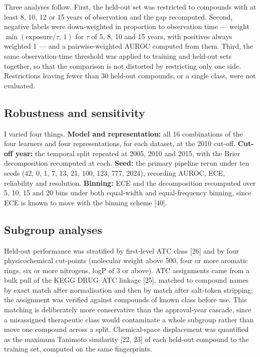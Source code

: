 \documentclass[pdflatex,sn-basic,Numbered,referee,lineno]{sn-jnl}%
\theoremstyle{thmstyleone}%
\theoremstyle{thmstyletwo}%
\theoremstyle{thmstylethree}%
\begin{document}
Three analyses follow. First, the held-out set was restricted to compounds with at least 8, 10, 12 or 15 years of observation and the gap recomputed. Second, negative labels were down-weighted in proportion to observation time --- weight $\min(\mathrm{exposure}/\tau,\,1)$ for $\tau$ of 5, 8, 10 and 15 years, with positives always weighted 1 --- and a pairwise-weighted AUROC computed from them. Third, the same observation-time threshold was applied to training and held-out sets together, so that the comparison is not distorted by restricting only one side. Restrictions leaving fewer than 30 held-out compounds, or a single class, were not evaluated.

\subsection{Robustness and sensitivity}

I varied four things. \textbf{Model and representation:} all 16 combinations of the four learners and four representations, for each dataset, at the 2010 cut-off. \textbf{Cut-off year:} the temporal split repeated at 2005, 2010 and 2015, with the Brier decomposition recomputed at each. \textbf{Seed:} the primary pipeline rerun under ten seeds (42, 0, 1, 7, 13, 21, 100, 123, 777, 2024), recording AUROC, ECE, reliability and resolution. \textbf{Binning:} ECE and the decomposition recomputed over 5, 10, 15 and 20 bins under both equal-width and equal-frequency binning, since ECE is known to move with the binning scheme [40].

\subsection{Subgroup analyses}

Held-out performance was stratified by first-level ATC class [26] and by four physicochemical cut-points (molecular weight above 500, four or more aromatic rings, six or more nitrogens, logP of 3 or above). ATC assignments came from a bulk pull of the KEGG DRUG--ATC linkage [25], matched to compound names by exact match after normalisation and then by match after salt-token stripping; the assignment was verified against compounds of known class before use. This matching is deliberately more conservative than the approval-year cascade, since a misassigned therapeutic class would contaminate a whole subgroup rather than move one compound across a split. Chemical-space displacement was quantified as the maximum Tanimoto similarity [22, 23] of each held-out compound to the training set, computed on the same fingerprints.
\end{document}

